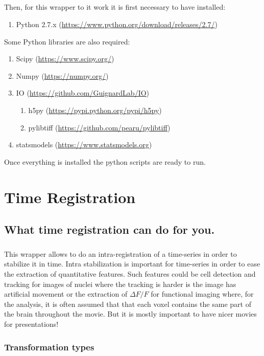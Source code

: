 \documentclass[10pt,a4paper]{book}
\begin{document}
{\paragraph{}Then, for this wrapper to it work it is first necessary to have installed:
\begin{enumerate}
\item[-] Python 2.7.x (\url{https://www.python.org/download/releases/2.7/})
\end{enumerate}
Some Python libraries are also required:
\begin{enumerate}
\item[-] Scipy (\url{https://www.scipy.org/})
\item[-] Numpy (\url{https://numpy.org/})
\item[-] IO (\url{https://github.com/GuignardLab/IO})
\begin{enumerate}
\item[-] h5py (\url{https://pypi.python.org/pypi/h5py})
\item[-] pylibtiff (\url{https://github.com/pearu/pylibtiff})
\end{enumerate}
\item[-] statsmodels (\url{https://www.statsmodels.org})
\end{enumerate}
Once everything is installed the python scripts are ready to run.}
\chapter{Time Registration}
\section{What time registration can do for you.}
\paragraph{}This wrapper allows to do an intra-registration of a time-series in order to stabilize it in time. Intra stabilization is important for time-series in order to ease the extraction of quantitative features. Such features could be cell detection and tracking for images of nuclei where the tracking is harder is the image has artificial movement or the extraction of $\Delta F/F$ for functional imaging where, for the analysis, it is often assumed that that each voxel contains the same part of the brain throughout the movie. But it is mostly important to have nicer movies for presentations!
\subsection{Transformation types}
\end{document}
